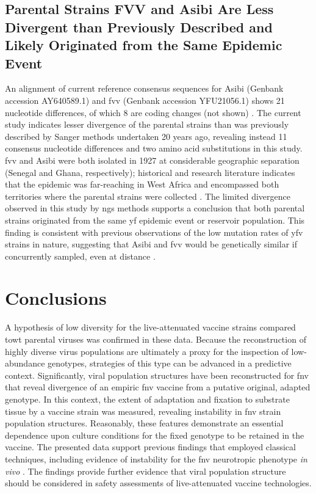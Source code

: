 \subsection{Parental Strains FVV and Asibi Are Less Divergent than Previously Described and Likely Originated from the Same Epidemic Event}
An alignment of current reference consensus sequences for Asibi (Genbank accession AY640589.1) and \gls{fvv} (Genbank accession YFU21056.1) shows 21 nucleotide differences, of which 8 are coding changes (not shown) \parencite{Wang:1995vu}. The current study indicates lesser divergence of the parental strains than was previously described by Sanger methods undertaken 20 years ago, revealing instead 11 consensus nucleotide differences and two amino acid substitutions in this study. \gls{fvv} and Asibi were both isolated in 1927 at considerable geographic separation (Senegal and Ghana, respectively); historical and research literature indicates that the epidemic was far-reaching in West Africa and encompassed both territories where the parental strains were collected \parencites{Stokes:1928uh}[415]{Bazin:2011vi}. The limited divergence observed in this study by \gls{ngs} methods supports a conclusion that both parental strains originated from the same \gls{yf} epidemic event or reservoir population. This finding is consistent with previous observations of the low mutation rates of \gls{yfv} strains in nature, suggesting that Asibi and \gls{fvv} would be genetically similar if concurrently sampled, even at distance \parencite{Sall:2010db}. 	

\section{Conclusions}
A hypothesis of low diversity for the live-attenuated vaccine strains compared to\gls{wt} parental viruses was confirmed in these data. Because the reconstruction of highly diverse virus populations are ultimately a proxy for the inspection of low-abundance genotypes, strategies of this type can be advanced in a predictive context. Significantly, viral population structures have been reconstructed for \gls{fnv} that reveal divergence of an empiric \gls{fnv} vaccine from a putative original, adapted genotype. In this context, the extent of adaptation and fixation to substrate tissue by a vaccine strain was measured, revealing instability in \gls{fnv} strain population structures. Reasonably, these features demonstrate an essential dependence upon culture conditions for the fixed genotype to be retained in the vaccine. The presented data support previous findings that employed classical techniques, including evidence of instability for the \gls{fnv} neurotropic phenotype \emph{in vivo} \parencite{Holbrook:2000ut,Wang:1995vu}. The findings provide further evidence that viral population structure should be considered in safety assessments of live-attenuated vaccine technologies.


